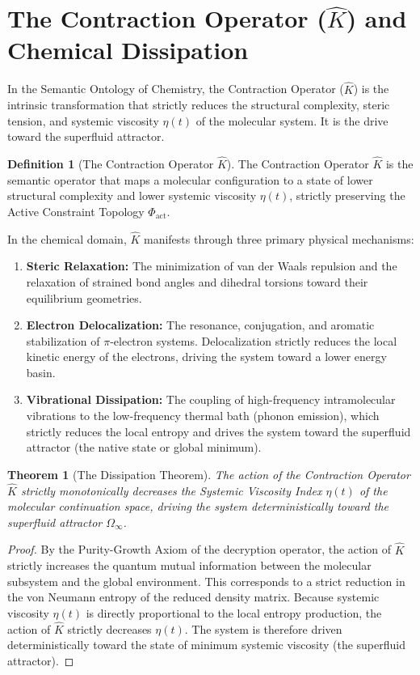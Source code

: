 \documentclass[11pt,openany]{extbook}
\theoremstyle{plain}
\newtheorem{theorem}{Theorem}[chapter]
\theoremstyle{definition}
\newtheorem{definition}{Definition}[chapter]
\begin{document}
\section{The Contraction Operator ($\hat{K}$) and Chemical Dissipation}

In the Semantic Ontology of Chemistry, the Contraction Operator ($\hat{K}$) is the intrinsic transformation that strictly reduces the structural complexity, steric tension, and systemic viscosity $\eta(t)$ of the molecular system. It is the drive toward the superfluid attractor.

\begin{definition}[The Contraction Operator $\hat{K}$]
The Contraction Operator $\hat{K}$ is the semantic operator that maps a molecular configuration to a state of lower structural complexity and lower systemic viscosity $\eta(t)$, strictly preserving the Active Constraint Topology $\Phi_{\text{act}}$.
\end{definition}

In the chemical domain, $\hat{K}$ manifests through three primary physical mechanisms:
\begin{enumerate}
    \item \textbf{Steric Relaxation:} The minimization of van der Waals repulsion and the relaxation of strained bond angles and dihedral torsions toward their equilibrium geometries.
    \item \textbf{Electron Delocalization:} The resonance, conjugation, and aromatic stabilization of $\pi$-electron systems. Delocalization strictly reduces the local kinetic energy of the electrons, driving the system toward a lower energy basin.
    \item \textbf{Vibrational Dissipation:} The coupling of high-frequency intramolecular vibrations to the low-frequency thermal bath (phonon emission), which strictly reduces the local entropy and drives the system toward the superfluid attractor (the native state or global minimum).
\end{enumerate}

\begin{theorem}[The Dissipation Theorem]
The action of the Contraction Operator $\hat{K}$ strictly monotonically decreases the Systemic Viscosity Index $\eta(t)$ of the molecular continuation space, driving the system deterministically toward the superfluid attractor $\Omega_{\infty}$.
\end{theorem}
\begin{proof}
By the Purity-Growth Axiom of the decryption operator, the action of $\hat{K}$ strictly increases the quantum mutual information between the molecular subsystem and the global environment. This corresponds to a strict reduction in the von Neumann entropy of the reduced density matrix. Because systemic viscosity $\eta(t)$ is directly proportional to the local entropy production, the action of $\hat{K}$ strictly decreases $\eta(t)$. The system is therefore driven deterministically toward the state of minimum systemic viscosity (the superfluid attractor).
\end{proof}
\end{document}
